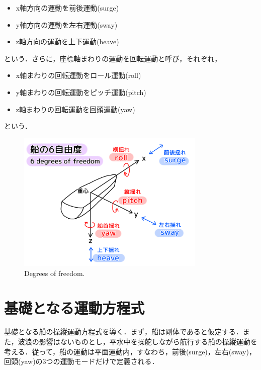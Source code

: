 \begin{itemize}
	\item x軸方向の運動を前後運動(surge)
    \item y軸方向の運動を左右運動(sway)
    \item z軸方向の運動を上下運動(heave)
\end{itemize}

という．さらに，座標軸まわりの運動を回転運動と呼び，それぞれ，

\begin{itemize}
	\item x軸まわりの回転運動をロール運動(roll)
    \item y軸まわりの回転運動をピッチ運動(pitch)
    \item z軸まわりの回転運動を回頭運動(yaw)
\end{itemize}

という．

\begin{figure}[htbp]
    \centering   
    \includegraphics[width=0.8\textwidth]{./img/2-1.png}
    \caption{Degrees of freedom.}
    \label{fig:2-1_png}
\end{figure}

\section{基礎となる運動方程式}
基礎となる船の操縦運動方程式を導く．まず，船は剛体であると仮定する．また，波浪の影響はないものとし，平水中を操舵しながら航行する船の操縦運動を考える．従って，船の運動は平面運動内，すなわち，前後(surge)，左右(sway)，回頭(yaw)の3つの運動モードだけで定義される．

